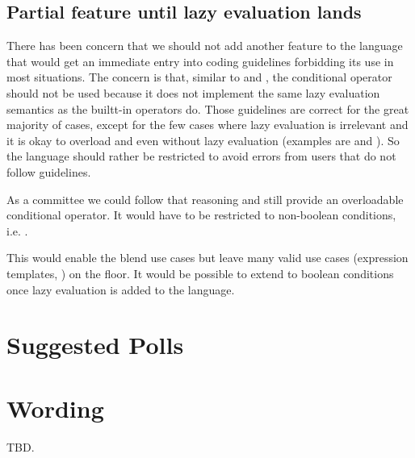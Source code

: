 \subsection{Partial feature until lazy evaluation lands}
There has been concern that we should not add another feature to the language that would get an immediate entry into coding guidelines forbidding its use in most situations.
The concern is that, similar to  and , the conditional operator should not be used because it does not implement the same lazy evaluation semantics as the builtt-in operators do.
Those guidelines are correct for the great majority of cases, except for the few cases where lazy evaluation is irrelevant and it is okay to overload \code{\&\&} and \code{||} even without lazy evaluation (examples are  and ).
So the language should rather be restricted to avoid errors from users that do not follow guidelines.

As a committee we could follow that reasoning and still provide an overloadable conditional operator.
It would have to be restricted to non-boolean conditions, i.e. .

This would enable the blend use cases but leave many valid use cases (expression templates, ) on the floor.
It would be possible to extend  to boolean conditions once lazy evaluation is added to the language.

\section{Suggested Polls}






\section{Wording}
TBD.


